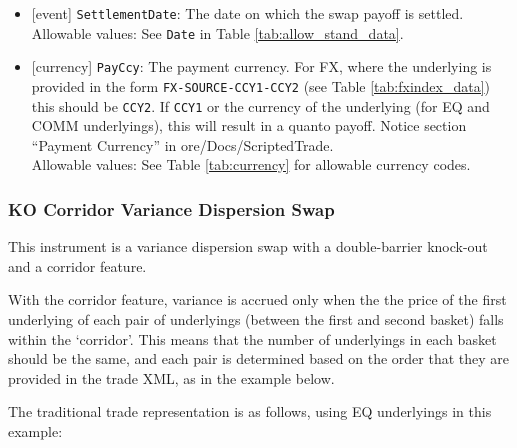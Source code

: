 \begin{itemize}
  \item{}[event] \lstinline!SettlementDate!: The date on which the swap payoff is settled. \\
  Allowable values: See \lstinline!Date! in Table \ref{tab:allow_stand_data}.
  \item{}[currency] \lstinline!PayCcy!: The payment currency. For FX, where the underlying is provided
      in the form \lstinline!FX-SOURCE-CCY1-CCY2! (see Table \ref{tab:fxindex_data}) this should
      be \lstinline!CCY2!. If \lstinline!CCY1! or the currency of the underlying (for EQ and
      COMM underlyings), this will result in a quanto payoff. Notice section ``Payment Currency'' in ore/Docs/ScriptedTrade. \\
        Allowable values: See Table \ref{tab:currency} for allowable currency codes.
\end{itemize}

\subsubsection*{KO Corridor Variance Dispersion Swap}

This instrument is a variance dispersion swap with a double-barrier knock-out and a corridor feature.

With the corridor feature, variance is accrued only when the the price of the first underlying of each pair of
underlyings (between the first and second basket) falls within the `corridor'. This means that the number of
underlyings in each basket should be the same, and each pair is determined based on the order that they are
provided in the trade XML, as in the example below.

The traditional trade representation is as follows, using EQ underlyings in this example:

